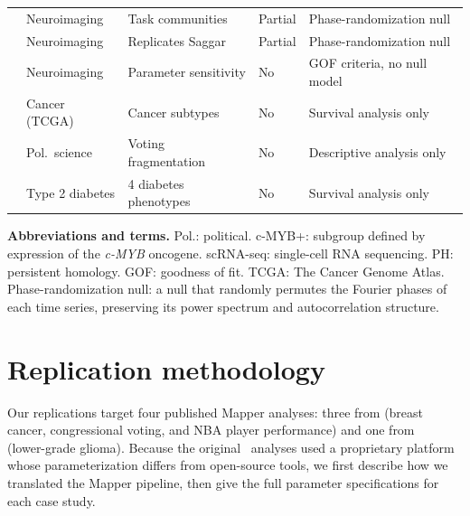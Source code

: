 \documentclass[hidelinks]{siamart251216}
\begin{document}
\begin{table}[ht]
\begin{tabular}{@{}lllll@{}}
\cite{Saggar2018}
  & Neuroimaging
  & Task communities
  & Partial
  & Phase-randomization null \\[4pt]

\cite{Geniesse2022}
  & Neuroimaging
  & Replicates Saggar
  & Partial
  & Phase-randomization null \\[4pt]

\cite{Hasegan2024}
  & Neuroimaging
  & Parameter sensitivity
  & No
  & GOF criteria, no null model \\[4pt]

\cite{Rafique2020}
  & Cancer (TCGA)
  & Cancer subtypes
  & No
  & Survival analysis only \\[4pt]

\cite{Lum2012}
  & Pol.\ science
  & Voting fragmentation
  & No
  & Descriptive analysis only \\[4pt]

\cite{Wamil2023}
  & Type 2 diabetes
  & 4 diabetes phenotypes
  & No
  & Survival analysis only \\

\bottomrule
\end{tabular}

\medskip
\raggedright
\scriptsize
\textbf{Abbreviations and terms.}
Pol.: political.
c-MYB+: subgroup defined by expression of the \emph{c-MYB} oncogene.
scRNA-seq: single-cell RNA sequencing.
PH: persistent homology.
GOF: goodness of fit.
TCGA: The Cancer Genome Atlas.
Phase-randomization null: a null that randomly permutes the Fourier
phases of each time series, preserving its power spectrum and
autocorrelation structure.
\end{table}


\section{Replication methodology}\label{sm:replication}

Our replications target four published Mapper analyses: three from
\cite{Lum2013} (breast cancer, congressional voting, and NBA player
performance) and one from~\cite{RabadanCamara2020} (lower-grade glioma).
Because the original~\cite{Lum2013} analyses used a proprietary platform
whose parameterization differs from open-source tools, we first describe
how we translated the Mapper pipeline, then give the full parameter
specifications for each case study.
\end{document}
